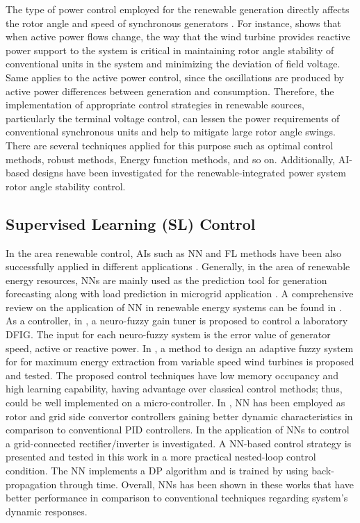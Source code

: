 \documentclass[journal]{IEEEtran}
\begin{document}
The type of power control employed for the renewable generation directly affects the rotor angle and speed of synchronous generators \cite{6915705}. For instance, \cite{6345466} shows that when active power flows change, the way that the wind turbine provides reactive power support to the system is critical in maintaining rotor angle stability of conventional units in the system and minimizing the deviation of field voltage. Same applies to the active power control, since the oscillations are produced by active power differences between generation and consumption. Therefore, the implementation of appropriate control strategies in renewable sources, particularly the terminal voltage control, can lessen the power requirements of conventional synchronous units and help to mitigate large rotor angle swings. There are several techniques applied for this purpose such as optimal control methods, robust methods, Energy function methods, and so on. Additionally, AI-based designs have been investigated for the renewable-integrated power system rotor angle stability control.


\subsection{Supervised Learning (SL) Control}
In the area renewable control, AIs such as NN and FL methods have been also successfully applied in different applications \cite{kalogirou2001artificial, 5928436, 4458230, soares2010nonlinear, 6612721}. Generally, in the area of renewable energy resources, NNs are mainly used as the prediction tool for generation forecasting along with load prediction in microgrid application \cite{li2001using}. A comprehensive review on the application of NN in renewable energy systems can be found in \cite{kalogirou2001artificial}. As a controller, in \cite{5928436}, a neuro-fuzzy gain tuner is proposed to control a laboratory DFIG. The input for each neuro-fuzzy system is the error value of generator speed, active or reactive power. In \cite{4458230}, a method to design an adaptive fuzzy system for for maximum energy extraction from variable speed wind turbines is proposed and tested. The proposed control techniques have low memory occupancy and high learning capability, having advantage over classical control methods; thus, could be well implemented on a micro-controller. In \cite{soares2010nonlinear}, NN has been employed as rotor and grid side convertor controllers gaining better dynamic characteristics in comparison to conventional PID controllers. In the \cite{6612721} application of NNs to control a grid-connected rectifier/inverter is investigated. A NN-based control strategy is presented and tested in this work in a more practical nested-loop control condition. The NN implements a DP algorithm and is trained by using back-propagation through time. Overall, NNs has been shown in these works that have better performance in comparison to conventional techniques regarding system's dynamic responses.
\end{document}
